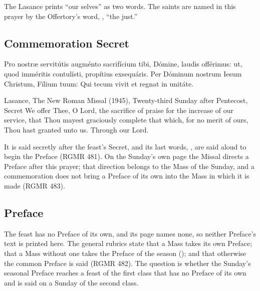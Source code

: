 \noindent The Lasance prints ``our selves'' as two words. The saints are named
in this prayer by the Offertory's word, , ``the just.''

\subsection{Commemoration Secret}
\label{proper-commemoration-secret}


\begin{latinproper}
Pro nostræ servitútis augménto sacrifícium tibi, Dómine, laudis offérimus:
ut, quod imméritis contulísti, propítius exsequáris. Per Dóminum nostrum
Iesum Christum, Fílium tuum: Qui tecum vivit et regnat in unitáte.
\end{latinproper}

\begin{englishwitness}{Lasance, The New Roman Missal (1945), Twenty-third Sunday after Pentecost, Secret}
We offer Thee, O Lord, the sacrifice of praise for the increase of our
service, that Thou mayest graciously complete that which, for no merit of
ours, Thou hast granted unto us. Through our Lord.
\end{englishwitness}

\noindent It is said secretly after the feast's Secret, and its last words,
, are said aloud to begin the Preface
(RGMR 481). On the Sunday's own page the Missal directs a Preface after this
prayer; that direction belongs to the Mass of the Sunday, and a commemoration
does not bring a Preface of its own into the Mass in which it is made (RGMR
483).

\subsection{Preface}
\label{proper-preface}


\noindent The feast has no Preface of its own, and its page names none, so
neither Preface's text is printed here. The general rubrics state that a Mass
takes its own Preface; that a Mass without one takes the Preface of the season
(); and that otherwise the common Preface is said (RGMR
482). The question is whether the Sunday's seasonal Preface reaches a feast of
the first class that has no Preface of its own and is said on a Sunday of the
second class.

